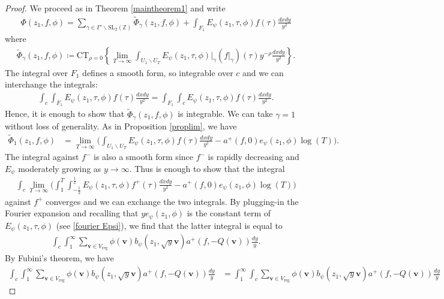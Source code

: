 \documentclass[twoside,a4paper,10pt]{article} %
\newcommand{\dxdy}{\frac{dxdy}{y^2}}
\newcommand{\8}{\infty}
\newcommand{\Z}{\mathbb{Z}}
\newcommand{\vbf}{\mathbf{v}}
\newcommand{\SL}{\mathrm{SL}}
\newcommand{\reg}{\mathrm{reg}}
\newcommand{\CT}{\mathrm{CT}_{\rho=0}}
\theoremstyle{mytheoremstyle}
\theoremstyle{remark}
\numberwithin{equation}{section}
\begin{document}
\begin{proof}
We proceed as in Theorem \ref{maintheorem1} and write
\begin{align}
\Phi(z_1,f,\phi)=\sum_{\gamma \in \Gamma' \backslash \SL_2(\Z)} \widetilde{\Phi}_\gamma(z_1,f,\phi)+\int_{F_1}E_{\psi}(z_1,\tau,\phi)f(\tau) \dxdy
\end{align}
where
\begin{align}
\widetilde{\Phi}_\gamma(z_1,f,\phi) \coloneqq \CT \left \{ \lim_{T\rightarrow \8} \int_{U_1 \smallsetminus U_T} E_{\psi}(z_1,\tau,\phi) \vert_\gamma \left ( f \vert_\gamma \right )(\tau) y^{-\rho} \dxdy \right \}.
\end{align}
The integral over $F_1$ defines a smooth form, so integrable over $c$ and we can interchange the integrals:
\begin{align}
\int_{c}\int_{F_1}E_{\psi}(z_1,\tau,\phi)f(\tau) \dxdy=\int_{F_1}\int_{c} E_{\psi}(z_1,\tau,\phi)f(\tau) \dxdy.
\end{align}Hence, it is enough  to show that $\widetilde{\Phi}_\gamma(z_1,f,\phi)$ is integrable.  We can take $\gamma=1$ without loss of generality. As in Proposition \ref{proplim}, we have \begin{align}
\widetilde{\Phi}_1(z_1,f,\phi) & = \lim_{T\rightarrow \8} \bigg( \int_{U_1 \smallsetminus U_T} E_{\psi}(z_1,\tau,\phi)f(\tau) \dxdy -a^+(f,0)e_\psi(z_1,\phi)\log(T) \bigg).
\end{align}
The integral against $f^-$ is also a smooth form since $f^-$ is rapidly decreasing and $E_\psi$ moderately growing as $y\rightarrow \8$. Thus is enough to show that the integral
\begin{align}
\int_{c} \lim_{T\rightarrow \8} \bigg( \int_1^T\int_{-\frac{1}{2}}^{\frac{1}{2}} E_{\psi}(z_1,\tau,\phi)f^+(\tau) \dxdy -a^+(f,0)e_\psi(z_1,\phi)\log(T) \bigg)
\end{align}
against $f^+$ converges and we can exchange the two integrals.  By plugging-in the Fourier expansion and recalling that $ye_\psi(z_1,\phi)$ is the constant term of $E_{\psi}(z_1,\tau,\phi)$ (see \eqref{fourier Epsi}), we find that the latter integral is equal to
\begin{align} \label{convergence}
\int_{c} \int_1^\8 \sum_{\vbf \in V_\reg} \phi(\vbf)b_\psi(z_1,\sqrt{y}\vbf)a^+(f,-Q(\vbf)) \frac{dy}{y}.
\end{align} By Fubini's theorem, we have
\begin{align}
\int_{c} \int_1^\8 \sum_{\vbf \in V_\reg} \phi(\vbf)b_\psi(z_1,\sqrt{y}\vbf)a^+(f,-Q(\vbf)) \frac{dy}{y} &= \int_1^\8 \int_{c} \sum_{\vbf \in V_\reg} \phi(\vbf)b_\psi(z_1,\sqrt{y}\vbf)a^+(f,-Q(\vbf)) \frac{dy}{y}

\end{align}
\end{proof}
\end{document}
